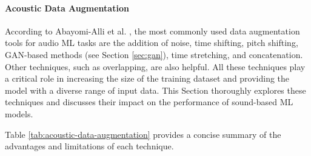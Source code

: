 \paragraph{Acoustic Data Augmentation}

According to Abayomi-Alli et al. \cite{abayomi-alli_data_2022}, the most commonly used data augmentation tools for audio \ac{ML} tasks are the addition of noise, time shifting, pitch shifting, \ac{GAN}-based methods (see Section \ref{sec:gan}), time stretching, and concatenation. Other techniques, such as overlapping, are also helpful. All these techniques play a critical role in increasing the size of the training dataset and providing the model with a diverse range of input data. This Section thoroughly explores these techniques and discusses their impact on the performance of sound-based \ac{ML} models.

Table \ref{tab:acoustic-data-augmentation} provides a concise summary of the advantages and limitations of each technique.

